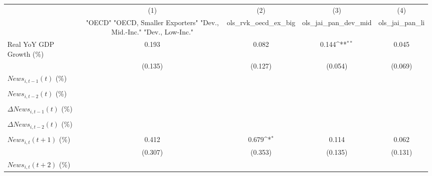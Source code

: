 {
\def\sym#1{\ifmmode^{#1}\else\(^{#1}\)\fi}
\begin{tabular}{l*{4}{c}}
\toprule
                    &\multicolumn{1}{c}{(1)}&\multicolumn{1}{c}{(2)}&\multicolumn{1}{c}{(3)}&\multicolumn{1}{c}{(4)}\\
                    &\multicolumn{1}{c}{ "OECD" "OECD, Smaller Exporters" "Dev., Mid.-Inc." "Dev., Low-Inc."}&\multicolumn{1}{c}{ols_rvk_oecd_ex_big}&\multicolumn{1}{c}{ols_jai_pan_dev_mid}&\multicolumn{1}{c}{ols_jai_pan_li}\\
\midrule
Real YoY GDP Growth (\%)&       0.193         &       0.082         &       0.144\sym{**} &       0.045         \\
                    &     (0.135)         &     (0.127)         &     (0.054)         &     (0.069)         \\
\addlinespace
$ News_{i,t-1}(t)$ (\%)&                     &                     &                     &                     \\
                    &                     &                     &                     &                     \\
\addlinespace
$ News_{i,t-2}(t)$ (\%)&                     &                     &                     &                     \\
                    &                     &                     &                     &                     \\
\addlinespace
$ \Delta News_{i,t-1}(t)$ (\%)&                     &                     &                     &                     \\
                    &                     &                     &                     &                     \\
\addlinespace
$ \Delta News_{i,t-2}(t)$ (\%)&                     &                     &                     &                     \\
                    &                     &                     &                     &                     \\
\addlinespace
$ News_{i,t}(t+1)$ (\%)&       0.412         &       0.679\sym{*}  &       0.114         &       0.062         \\
                    &     (0.307)         &     (0.353)         &     (0.135)         &     (0.131)         \\
\addlinespace
$ News_{i,t}(t+2)$ (\%)&                     &                     &                     &                     \\

\end{tabular}}
